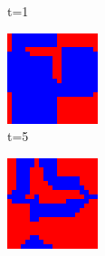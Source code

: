 \documentclass[a4paper, 11pt]{article}
\begin{document}
\begin{figure}[H]
\begin{subfigure}{.16\textwidth}
  \caption{t=1}
\end{subfigure}%
\begin{subfigure}{.16\textwidth}
  \centering
  \includegraphics[width=0.9\linewidth]{PRISONERS_DILEMMA_MOORE_20x20_t05}
  \caption{t=5}
\end{subfigure}
\begin{subfigure}{.16\textwidth}
  \centering
  \includegraphics[width=0.9\linewidth]{PRISONERS_DILEMMA_MOORE_20x20_t10}

\end{subfigure}
\end{figure}
\end{document}
